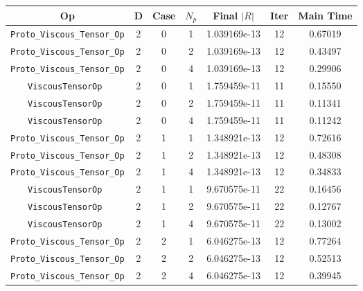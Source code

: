 \documentclass{article}
\begin{document}

\begin{small}
\begin{table}
\begin{center}
\begin{tabular}{|c|c|c|c|c|c||c|} \hline
 Op & D & Case & $N_p$ & Final $|R|$  &  Iter & Main Time \\
\hline
 {\tt Proto\_Viscous\_Tensor\_Op}      & 2 & 0 & 1   & 1.039169e-13   &  12     & 0.67019    \\
 {\tt Proto\_Viscous\_Tensor\_Op}      & 2 & 0 & 2   & 1.039169e-13   &  12     & 0.43497    \\
 {\tt Proto\_Viscous\_Tensor\_Op}      & 2 & 0 & 4   & 1.039169e-13   &  12     & 0.29906    \\
\hline                                                                              
 {\tt ViscousTensorOp   }              & 2 & 0 & 1   & 1.759459e-11   &  11     & 0.15550    \\
 {\tt ViscousTensorOp   }              & 2 & 0 & 2   & 1.759459e-11   &  11     & 0.11341    \\
 {\tt ViscousTensorOp   }              & 2 & 0 & 4   & 1.759459e-11   &  11     & 0.11242    \\
\hline
 {\tt Proto\_Viscous\_Tensor\_Op}      & 2 & 1 & 1   & 1.348921e-13   &  12     & 0.72616    \\
 {\tt Proto\_Viscous\_Tensor\_Op}      & 2 & 1 & 2   & 1.348921e-13   &  12     & 0.48308    \\
 {\tt Proto\_Viscous\_Tensor\_Op}      & 2 & 1 & 4   & 1.348921e-13   &  12     & 0.34833    \\
\hline                                                                             
 {\tt ViscousTensorOp   }              & 2 & 1 & 1   & 9.670575e-11   &  22     & 0.16456    \\
 {\tt ViscousTensorOp   }              & 2 & 1 & 2   & 9.670575e-11   &  22     & 0.12767    \\
 {\tt ViscousTensorOp   }              & 2 & 1 & 4   & 9.670575e-11   &  22     & 0.13002    \\
\hline
 {\tt Proto\_Viscous\_Tensor\_Op}      & 2 & 2 & 1   & 6.046275e-13   &  12     & 0.77264    \\
 {\tt Proto\_Viscous\_Tensor\_Op}      & 2 & 2 & 2   & 6.046275e-13   &  12     & 0.52513    \\
 {\tt Proto\_Viscous\_Tensor\_Op}      & 2 & 2 & 4   & 6.046275e-13   &  12     & 0.39945    \\

\end{tabular}
\end{center}
\end{table}
\end{small}
\end{document}
